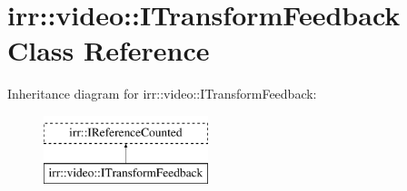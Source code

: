 \hypertarget{classirr_1_1video_1_1ITransformFeedback}{}\section{irr\+:\+:video\+:\+:I\+Transform\+Feedback Class Reference}
\label{classirr_1_1video_1_1ITransformFeedback}
Inheritance diagram for irr\+:\+:video\+:\+:I\+Transform\+Feedback\+:\begin{figure}[H]
\begin{center}
\leavevmode
\includegraphics[height=2.000000cm]{classirr_1_1video_1_1ITransformFeedback}
\end{center}
\end{figure}
